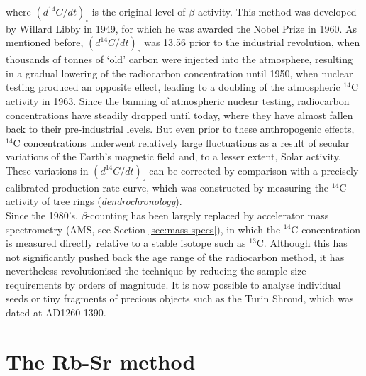 \documentclass{book}
\begin{document}
where $(d^{14}C/dt)_\circ$ is the original level of $\beta$ activity.
This method was developed by Willard Libby in 1949, for which he was
awarded the Nobel Prize in 1960. As mentioned before,
$(d^{14}C/dt)_\circ$ was 13.56 prior to the industrial revolution,
when thousands of tonnes of `old' carbon were injected into the
atmosphere, resulting in a gradual lowering of the radiocarbon
concentration until 1950, when nuclear testing produced an opposite
effect, leading to a doubling of the atmospheric $^{14}$C activity in
1963. Since the banning of atmospheric nuclear testing, radiocarbon
concentrations have steadily dropped until today, where they have
almost fallen back to their pre-industrial levels. But even prior to
these anthropogenic effects, $^{14}$C concentrations underwent
relatively large fluctuations as a result of secular variations of the
Earth's magnetic field and, to a lesser extent, Solar activity. These
variations in $(d^{14}C/dt)_\circ$ can be corrected by comparison with
a precisely calibrated production rate curve, which was constructed by
measuring the $^{14}$C activity of tree rings
(\emph{dendrochronology}).\\

Since the 1980's, $\beta$-counting has been largely replaced by
accelerator mass spectrometry (AMS, see Section \ref{sec:mass-specs}),
in which the $^{14}$C concentration is measured directly relative to a
stable isotope such as $^{13}$C. Although this has not significantly
pushed back the age range of the radiocarbon method, it has
nevertheless revolutionised the technique by reducing the sample size
requirements by orders of magnitude. It is now possible to analyse
individual seeds or tiny fragments of precious objects such as the
Turin Shroud, which was dated at AD1260-1390.

\section{The Rb-Sr method}
\label{sec:Rb-Sr}
\end{document}
